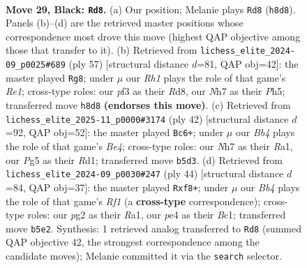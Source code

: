 \documentclass[11pt]{article}
\begin{document}
\clearpage

\begin{figure}[p]\centering
\begin{subfigure}{0.46\textwidth}\centering
\resizebox{\linewidth}{!}{%
\newchessgame
\chessboard[
  setfen={1k5r/1p2p1bn/1r1p4/1b1Q2p1/3PP3/1PR2P2/6PP/1K5R b - - 3 29},
  showmover=false,
  pgfstyle=straightmove, color=movearrow, markmove={h8-d8}
]}
\caption{}
\end{subfigure}\hfill
\begin{subfigure}{0.46\textwidth}\centering
\resizebox{\linewidth}{!}{%
\newchessgame
\chessboard[
  setfen={2krr3/1p3RP1/2p5/p3p2p/Pb2Q2P/1P6/KBP1R3/6q1 b - - 0 29},
  showmover=false,
  pgfstyle=straightmove, color=movearrow, markmove={e8-g8}
]}
\caption{}
\end{subfigure}
\\[4pt]
\begin{subfigure}{0.46\textwidth}\centering
\resizebox{\linewidth}{!}{%
\newchessgame
\chessboard[
  setfen={1r2k2r/5ppp/Q3pb2/1p2p3/1Pq1B3/P3P3/5PKP/R2R4 w k - 0 22},
  showmover=false,
  pgfstyle=straightmove, color=movearrow, markmove={e4-c6}
]}
\caption{}
\end{subfigure}\hfill
\begin{subfigure}{0.46\textwidth}\centering
\resizebox{\linewidth}{!}{%
\newchessgame
\chessboard[
  setfen={r2k1r2/pp2p3/2p5/3pq1P1/4n1pP/8/PPP1N3/R1B1KR2 w Q - 0 23},
  showmover=false,
  pgfstyle=straightmove, color=movearrow, markmove={f1-f8}
]}
\caption{}
\end{subfigure}
\caption{\textbf{Move 29, Black: \texttt{Rd8}.} (a) Our position; Melanie plays \texttt{Rd8} (\texttt{h8d8}). Panels (b)--(d) are the retrieved master positions whose correspondence most drove this move (highest QAP objective among those that transfer to it). (b) Retrieved from \texttt{lichess\_elite\_2024-09\_p0025\#689} (ply 57) [structural distance $d$=81, QAP obj=42]: the master played \texttt{Rg8}; under $\mu$ our \emph{Rh1} plays the role of that game's \emph{Re1}; cross-type roles: our \emph{p}f3 as their \emph{R}d8, our \emph{N}h7 as their \emph{P}h5; transferred move \texttt{h8d8} \textbf{(endorses this move)}. (c) Retrieved from \texttt{lichess\_elite\_2025-11\_p0000\#3174} (ply 42) [structural distance $d$=92, QAP obj=52]: the master played \texttt{Bc6+}; under $\mu$ our \emph{Bb4} plays the role of that game's \emph{Be4}; cross-type roles: our \emph{N}h7 as their \emph{R}a1, our \emph{P}g5 as their \emph{R}d1; transferred move \texttt{b5d3}. (d) Retrieved from \texttt{lichess\_elite\_2024-09\_p0030\#247} (ply 44) [structural distance $d$=84, QAP obj=37]: the master played \texttt{Rxf8+}; under $\mu$ our \emph{Bb4} plays the role of that game's \emph{Rf1} (a \textbf{cross-type} correspondence); cross-type roles: our \emph{p}g2 as their \emph{R}a1, our \emph{p}e4 as their \emph{B}c1; transferred move \texttt{b5e2}. Synthesis: 1 retrieved analog transferred to \texttt{Rd8} (summed QAP objective 42, the strongest correspondence among the candidate moves); Melanie committed it via the \texttt{search} selector.}
\label{fig:thought-m57}
\end{figure}
\end{document}
